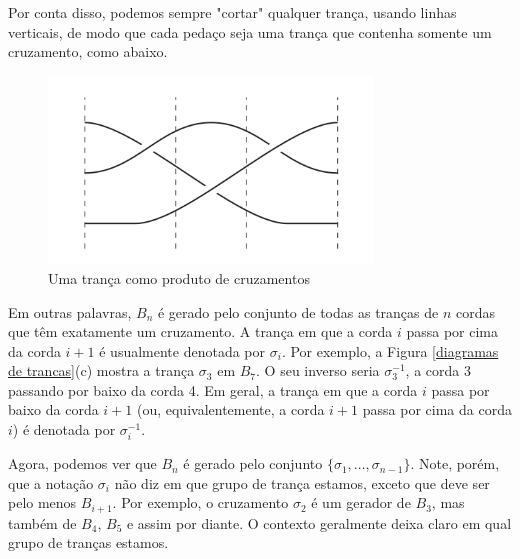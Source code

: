 \documentclass[a4paper,portuguese,11pt,twoside, leqno]{book}
\theoremstyle{definition}
\begin{document}
	\par\vspace{0.3cm} Por conta disso, podemos sempre "cortar" qualquer trança, usando linhas verticais, de modo que cada pedaço seja uma trança que contenha somente um cruzamento, como abaixo.
	
	\begin{figure}[H]
		\captionsetup{justification=centering}
		\begin{center}
			\includegraphics[width=8.6cm]{Images/fig_18_8.png}
		\end{center}\caption{Uma trança como produto de cruzamentos}\label{cortar trancas}
	\end{figure} 
	
	\par\vspace{0.3cm} Em outras palavras, $B_n$ é gerado pelo conjunto de todas as tranças de $n$ cordas que têm exatamente um cruzamento. A trança em que a corda $i$ passa por cima da corda $i+1$ é usualmente denotada por $\sigma_i$. Por exemplo, a Figura \eqref{diagramas de trancas}(c) mostra a trança $\sigma_3$ em $B_7$. O seu inverso seria $\sigma_3^{-1}$, a corda 3 passando por baixo da corda 4. Em geral, a trança em que a corda $i$ passa por baixo da corda $i+1$ (ou, equivalentemente, a corda $i+1$ passa por cima da corda $i$) é denotada por $\sigma_i^{-1}$. 
	
	\par\vspace{0.3cm} Agora, podemos ver que $B_n$ é gerado pelo conjunto $ \{ \sigma_1, \dots, \sigma_{n-1} \} $. Note, porém, que a notação $\sigma_i$ não diz em que grupo de trança estamos, exceto que deve ser pelo menos $B_{i+1}$. Por exemplo, o cruzamento $\sigma_2$ é um gerador de $B_3$, mas também de $B_4$, $B_5$ e assim por diante. O contexto geralmente deixa claro em qual grupo de tranças estamos. 
	
\end{document}

